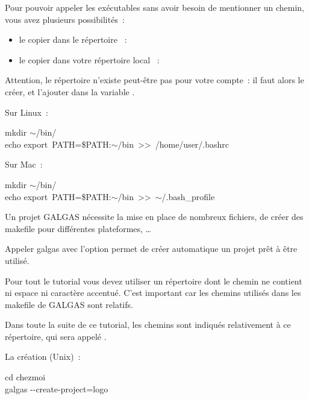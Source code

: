 Pour pouvoir appeler les exécutables sans avoir besoin de mentionner un chemin, vous avez plusieurs possibilités~:
\begin{itemize}
  \item le copier dans le répertoire ~:  
  \item le copier dans votre répertoire local ~: 
\end{itemize}

Attention, le répertoire  n'existe peut-être pas pour votre compte~: il faut alors le créer, et l'ajouter dans la variable .

Sur Linux~:
\begin{SHELL}
mkdir $\sim$/bin/\\
echo \textquotesingle export~PATH=\$PATH{}:$\sim$/bin\textquotesingle~\textgreater{}\textgreater~/home/user/.bashrc
\end{SHELL}

Sur Mac~:
\begin{SHELL}
mkdir $\sim$/bin/\\
echo \textquotesingle export~PATH=\$PATH{}:$\sim$/bin\textquotesingle~\textgreater{}\textgreater~$\sim$/.bash\_profile
\end{SHELL}














Un projet GALGAS nécessite la mise en place de nombreux fichiers, de créer des makefile pour différentes plateformes, …

Appeler galgas avec l'option  permet de créer automatique un projet prêt à être utilisé.

Pour tout le tutorial vous devez utiliser un répertoire dont le chemin ne contient ni espace ni caractère accentué. C'est important car les chemins utilisés dans les makefile de GALGAS sont relatifs.

Dans toute la suite de ce tutorial, les chemins sont indiqués relativement à ce répertoire, qui sera appelé .

La création (Unix)~:
\begin{SHELL}
cd chezmoi\\
galgas -{}-create-project=logo
\end{SHELL}

